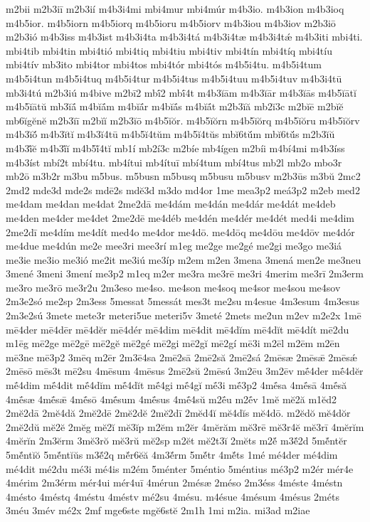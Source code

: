 {m2bii
m2b3iī
m2b3ií
m4b3i4mi
mbi4mur
mbi4múr
m4b3io.
m4b3ion
m4b3ioq
m4b5ior.
m4b5iorn
m4b5iorq
m4b5ioru
m4b5iorv
m4b3iou
m4b3iov
m2b3iō
m2b3ió
m4b3iss
m4b3ist
m4b3i4ta
m4b3i4tá
m4b3i4tæ
m4b3i4tǽ
m4b3iti
mbi4ti.
mbi4tib
mbi4tin
mbi4tió
mbi4tiq
mbi4tiu
mbi4tiv
mbi4tín
mbi4tíq
mbi4tíu
mbi4tív
mb3ito
mbi4tor
mbi4tos
mbi4tór
mbi4tós
m4b5i4tu.
m4b5i4tum
m4b5i4tun
m4b5i4tuq
m4b5i4tur
m4b5i4tus
m4b5i4tuu
m4b5i4tuv
m4b3i4tū
mb3i4tú
m2b3iú
m4bive
m2bī2
mbī́2
mbī́4t
m4b3ĭām
m4b3ĭār
m4b3ĭās
m4b5ĭātĭ
m4b5ĭātŭ
mb3ĭā́
m4bĭā́m
m4bĭā́r
m4bĭā́s
m4bĭā́t
m2b3ĭă
mb2ĭ3c
m2bĭē
m2bĭĕ
mb6ĭgĕnĕ
m2b3ĭī
m2bĭĭ
m2b3ĭō
m4b5ĭŏr.
m4b5ĭŏrn
m4b5ĭŏrq
m4b5ĭŏru
m4b5ĭŏrv
m4b3ĭŏ́
m4b3ĭtĭ
m4b3ĭ4tū
m4b5ĭ4tŭm
m4b5ĭ4tŭs
mbĭ6tŭ́m
mbĭ6tŭ́s
m2b3ĭŭ
m4b3ĭ́ĕ
m4b3ĭ́ĭ
m4b5ĭ́4tĭ
mb1í
mb2í3c
m2bíe
mb4ígen
m2bíi
m4bí4mi
m4b3íss
m4b3íst
mbí2t
mbí4tu.
mb4ítui
mb4ítuī
mbí4tum
mbí4tus
mb2l
mb2o
mbo3r
mb2ō
m3b2r
m3bu
m5bus.
m5busn
m5busq
m5busu
m5busv
m2b3ūs
m3bŭ
2mc2
2md2
mde3d
mde2s
mdē2s
mdĕ3d
m3do
md4or
1me
mea3p2
meá3p2
m2eb
med2
me4dam
me4dan
me4dat
2me2dā
me4dám
me4dán
me4dár
me4dát
me4deb
me4den
me4der
me4det
2me2dē
me4déb
me4dén
me4dér
me4dét
med4i
me4dim
2me2dī
me4dím
me4dít
med4o
me4dor
me4dō.
me4dōq
me4dōu
me4dōv
me4dór
me4due
me4dún
me2e
mee3ri
mee3rí
m1eg
me2ge
me2gé
me2gi
me3go
me3iá
me3ie
me3io
me3ió
me2it
me3iú
me3íp
m2em
m2en
3mena
3mená
men2e
me3neu
3mené
3meni
3mení
me3p2
m1eq
m2er
me3ra
me3rē
me3ri
4merim
me3rī
2m3erm
me3ro
me3rō
me3r2u
2m3eso
me4so.
me4son
me4soq
me4sor
me4sou
me4sov
2m3e2só
me2sp
2m3ess
5messat
5messát
mes3t
me2su
m4esue
4m3esum
4m3esus
2m3e2sú
3mete
mete3r
meteri5ue
meteri5v
3meté
2mets
me2un
m2ev
m2e2x
1mē
mē4der
mē4dēr
mē4dĕr
mē4dér
mē4dim
mē4dit
mē4dĭm
mē4dĭt
mē4dít
mē2du
m1ēg
mē2ge
mē2gē
mē2gĕ
mē2gé
mē2gi
mē2gĭ
mē2gí
mē3i
m2ēl
m2ēm
m2ēn
mē3ne
mē3p2
3mēq
m2ēr
2m3ē4sa
2mē2sā
2mē2să
2mē2sá
2mēsæ
2mēsǣ
2mēsǽ
2mēsō
mēs3t
mē2su
4mēsum
4mēsus
2mē2sŭ
2mēsú
3m2ēu
3m2ēv
mḗ4der
mḗ4dĕr
mḗ4dim
mḗ4dit
mḗ4dĭm
mḗ4dĭt
mḗ4gi
mḗ4gĭ
mḗ3i
mḗ3p2
4mḗsa
4mḗsā
4mḗsă
4mḗsæ
4mḗsǣ
4mḗsō
4mḗsum
4mḗsus
4mḗ4sŭ
m2ḗu
m2ḗv
1mĕ
mĕ2ă
m1ĕd2
2mĕ2dā
2mĕ4dă
2mĕ2dē
2mĕ2dĕ
2mĕ2dī
2mĕd4ĭ
mĕ4dĭs
mĕ4dō.
m2ĕdŏ
mĕ4dŏr
2mĕ2dŭ
mĕ2ĕ
2mĕg
mĕ2ĭ
mĕ3ĭp
m2ĕm
m2ĕr
4mĕrăm
mĕ3rē
mĕ3r4ĕ
mĕ3rī
4mĕrĭm
4mĕrĭn
2m3ĕrm
3mĕ3rŏ
mĕ3rŭ
mĕ2sp
m2ĕt
mĕ2t3ĭ
2mĕts
m2ĕ́
m3ĕ́2d
5mĕ́ntĕr
5mĕ́ntĭŏ
5mĕ́ntĭŭs
m3ĕ́2q
mĕ́r6ĕă
4m3ĕ́rm
5mĕ́tr
4mĕ́ts
1mé
mé4der
mé4dim
mé4dit
mé2du
mé3i
mé4is
m2ém
5ménter
5méntio
5méntius
mé3p2
m2ér
mér4e
4mérim
2m3érm
mér4ui
mér4uī
4mérun
2mésæ
2méso
2m3éss
4méste
4méstn
4mésto
4méstq
4méstu
4méstv
mé2su
4mésu.
m4ésue
4mésum
4mésus
2méts
3méu
3mév
mé2x
2mf
mge6ste
mgĕ6stĕ
2m1h
1mi
m2ia.
mi3ad
m2iae
}
